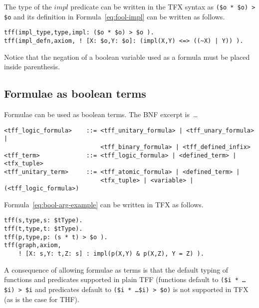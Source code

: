 \documentclass{easychair}
\begin{document}
The type of the $\mathit{impl}$ predicate can be written in the TFX syntax as
\verb'($o * $o) > $o' and its definition in Formula~\ref{eq:fool-impl} can be
written as follows.
\begin{verbatim}
tff(impl_type,type,impl: ($o * $o) > $o ).
tff(impl_defn,axiom, ! [X: $o,Y: $o]: (impl(X,Y) <=> ((~X) | Y)) ).
\end{verbatim}

Notice that the negation of a boolean variable used as a formula must be
placed inside parenthesis.

\subsection{Formulae as boolean terms}

Formulae can be used as boolean terms. 
The BNF excerpt is~\ldots
\begin{verbatim}
<tff_logic_formula>    ::= <tff_unitary_formula> | <tff_unary_formula> |
                           <tff_binary_formula> | <tff_defined_infix>
<tff_term>             ::= <tff_logic_formula> | <defined_term> | <tfx_tuple>
<tff_unitary_term>     ::= <tff_atomic_formula> | <defined_term> |
                           <tfx_tuple> | <variable> | (<tff_logic_formula>)
\end{verbatim}

Formula~\ref{eq:bool-arg-example} can be written in TFX as follows.
\begin{verbatim}
tff(s,type,s: $tType).
tff(t,type,t: $tType).
tff(p,type,p: (s * t) > $o ).
tff(graph,axiom,
    ! [X: s,Y: t,Z: s] : impl(p(X,Y) & p(X,Z), Y = Z) ).
\end{verbatim}

A consequence of allowing formulae as terms is that the default typing of 
functions and predicates supported in plain TFF (functions default to 
{\tt (\$i * \ldots * \$i) > \$i} and predicates default to 
{\tt (\$i * \ldots * \$i) > \$o)} is not supported in TFX (as is the case 
for THF).
\end{document}

